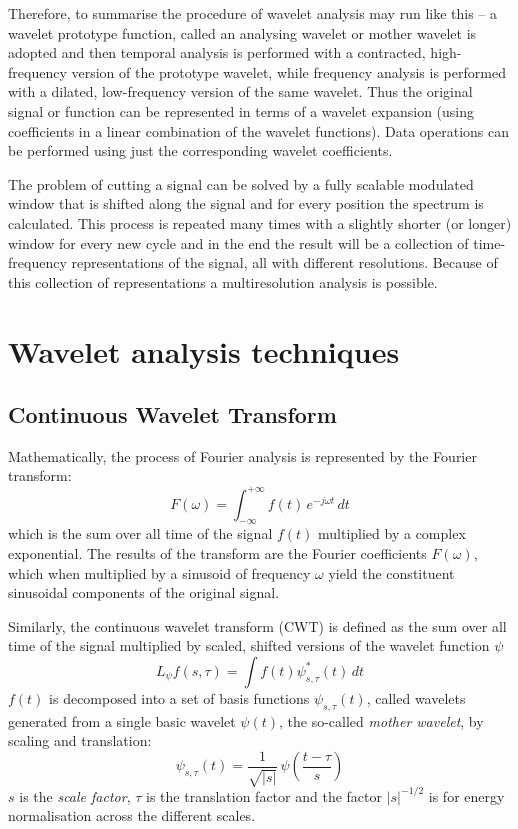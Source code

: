 \documentclass[a4paper,11pt]{report}
\begin{document}
Therefore, to summarise the procedure of wavelet analysis may run like this -- a wavelet prototype function, called an analysing wavelet or mother wavelet is adopted and then temporal analysis is performed with a contracted, high-frequency version of the prototype wavelet, while frequency analysis is performed with a dilated, low-frequency version of the same wavelet. Thus the original signal or function can be represented in terms of a wavelet expansion (using coefficients in a linear combination of the wavelet functions). Data operations can be performed using just the corresponding wavelet coefficients.

The problem of cutting a signal can be solved by a fully scalable modulated window that is shifted along the signal and for every position the spectrum is calculated. This process is repeated many times with a slightly shorter (or longer) window for every new cycle and in the end the result will be a collection of time-frequency representations of the signal, all with different resolutions. Because of this collection of representations a multiresolution analysis is possible.

\section{Wavelet analysis techniques}
\subsection*{Continuous Wavelet Transform}
Mathematically, the process of Fourier analysis is represented by the Fourier transform:
\begin{equation} \label{ft}
F(\omega) = \int_{-\infty}^{+\infty} f(t)\,e^{-j\omega t}\,dt
\end{equation}
which is the sum over all time of the signal $f(t)$ multiplied by a complex exponential. The results of the transform are the Fourier coefficients $F(\omega)$, which when multiplied by a sinusoid of frequency $\omega$ yield the constituent sinusoidal components of the original signal.

Similarly, the continuous wavelet transform (CWT) is defined as the sum over all time of the signal multiplied by scaled, shifted versions of the wavelet function $\psi$ \cite{daub}
\begin{equation} \label{cwt}
L_{\psi}f(s,\tau) = \int f(t)\psi^{\ast}_{s,\tau}(t)\,dt
\end{equation}
$f(t)$ is decomposed into a set of basis functions $\psi_{s,\tau}(t)$, called wavelets generated from a single basic wavelet $\psi(t)$, the so-called \emph{mother wavelet}, by scaling and translation:
\begin{displaymath}
\psi_{s,\tau}(t) = \frac{1}{\sqrt{|s|}} \, \psi \left( \frac{t - \tau}{s} \right)
\end{displaymath}
$s$ is the \emph{scale factor}, $\tau$ is the translation factor and the factor $|s|^{-1/2}$ is for energy normalisation across the different scales.
\end{document}
